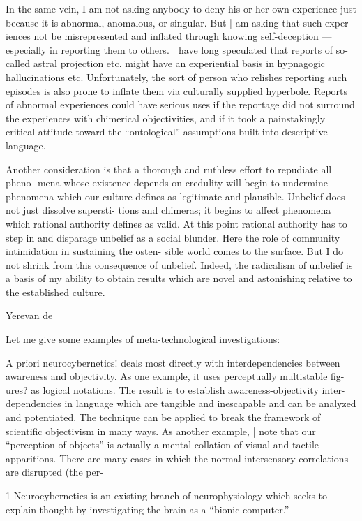 In the same vein, I am not asking anybody to deny his or her own experience just 
because it is abnormal, anomalous, or singular. But | am asking that such exper- 
iences not be misrepresented and inflated through knowing self-deception — 
especially in reporting them to others. | have long speculated that reports of 
so-called astral projection etc. might have an experiential basis in hypnagogic 
hallucinations etc. Unfortunately, the sort of person who relishes reporting such 
episodes is also prone to inflate them via culturally supplied hyperbole. Reports of 
abnormal experiences could have serious uses if the reportage did not surround the 
experiences with chimerical objectivities, and if it took a painstakingly critical 
attitude toward the “ontological” assumptions built into descriptive language. 

Another consideration is that a thorough and ruthless effort to repudiate all pheno- 
mena whose existence depends on credulity will begin to undermine phenomena which 
our culture defines as legitimate and plausible. Unbelief does not just dissolve supersti- 
tions and chimeras; it begins to affect phenomena which rational authority defines as 
valid. At this point rational authority has to step in and disparage unbelief as a 
social blunder. Here the role of community intimidation in sustaining the osten- 
sible world comes to the surface. But I do not shrink from this consequence of 
unbelief. Indeed, the radicalism of unbelief is a basis of my ability to obtain results which 
are novel and astonishing relative to the established culture. 


Yerevan de 


Let me give some examples of meta-technological investigations: 

A priori neurocybernetics! deals most directly with interdependencies between 
awareness and objectivity. As one example, it uses perceptually multistable fig- 
ures? as logical notations. The result is to establish awareness-objectivity inter- 
dependencies in language which are tangible and inescapable and can be analyzed 
and potentiated. The technique can be applied to break the framework of scientific 
objectivism in many ways. As another example, | note that our “perception of 
objects” is actually a mental collation of visual and tactile apparitions. There are 
many cases in which the normal intersensory correlations are disrupted (the per- 


1 Neurocybernetics is an existing branch of neurophysiology which seeks to explain thought by investigating the brain 
as a “bionic computer.” 


